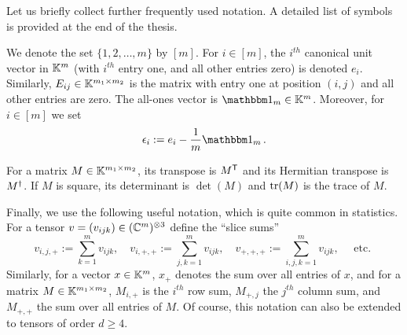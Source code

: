 \bigskip

Let us briefly collect further frequently used notation. A detailed list of symbols is provided at the end of the thesis.

We denote the set $\{1,2,\ldots,m\}$ by $[m]$. For $i \in [m]$, the $i^{th}$ canonical unit vector in $\mathbb K^m$ (with $i^{th}$ entry one, and all other entries zero)  is denoted $e_i$. Similarly, $E_{ij} \in \mathbb K^{m_1 \times m_2}$ is the matrix with entry one at position $(i,j)$ and all other entries are zero. The all-ones vector is $\ones_m \in \KK^m$. Moreover, for $i \in [m]$ we set
	\[ \eps_i := e_i - \frac{1}{m} \ones_m \, .\]

For a matrix $M \in \mathbb K^{m_1 \times m_2}$, its transpose is $M^{\mathsf{T}}$ and its Hermitian transpose is $M^{\dagger}$. If $M$ is square, its determinant is $\det(M)$ and $\operatorname{tr}(M)$ is the trace of $M$.

Finally, we use the following useful notation, which is quite common in statistics. For a tensor $v = (v_{ijk}) \in (\mathbb C^{m})^{\otimes 3}$ define the ``slice sums''
	\[ v_{i,j,+} := \sum_{k=1}^m v_{ijk}, \quad v_{i,+,+} := \sum_{j,k =1}^m v_{ijk}, \quad v_{+,+,+} := \sum_{i,j,k=1}^m v_{ijk}, \quad \text{ etc. } \]
Similarly, for a vector $x \in \mathbb K^m$, $x_+$ denotes the sum over all entries of $x$, and for a matrix $M \in \mathbb K^{m_1 \times m_2}$, $M_{i,+}$ is the $i^{th}$ row sum, $M_{+,j}$ the $j^{th}$ column sum, and $M_{+,+}$ the sum over all entries of $M$.
Of course, this notation can also be extended to tensors of order $d \geq 4$.



%
%
%
%
%
%
%



